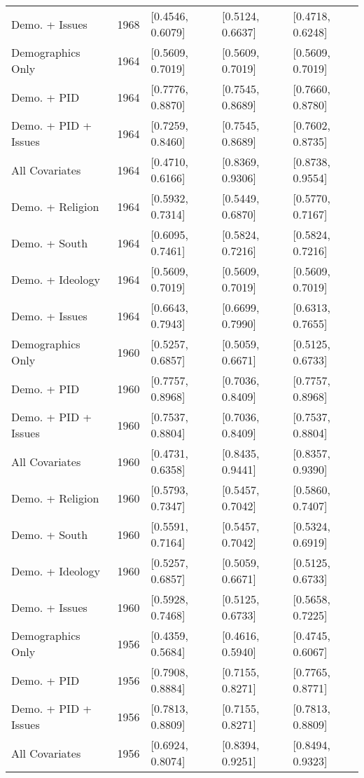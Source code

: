 \begin{longtable}{lrlll}
  Demo. + Issues & 1968 & [0.4546, 0.6079] & [0.5124, 0.6637] & [0.4718, 0.6248] \\ 
  Demographics Only & 1964 & [0.5609, 0.7019] & [0.5609, 0.7019] & [0.5609, 0.7019] \\ 
  Demo. + PID & 1964 & [0.7776, 0.8870] & [0.7545, 0.8689] & [0.7660, 0.8780] \\ 
  Demo. + PID + Issues & 1964 & [0.7259, 0.8460] & [0.7545, 0.8689] & [0.7602, 0.8735] \\ 
  All Covariates & 1964 & [0.4710, 0.6166] & [0.8369, 0.9306] & [0.8738, 0.9554] \\ 
  Demo. + Religion & 1964 & [0.5932, 0.7314] & [0.5449, 0.6870] & [0.5770, 0.7167] \\ 
  Demo. + South & 1964 & [0.6095, 0.7461] & [0.5824, 0.7216] & [0.5824, 0.7216] \\ 
  Demo. + Ideology & 1964 & [0.5609, 0.7019] & [0.5609, 0.7019] & [0.5609, 0.7019] \\ 
  Demo. + Issues & 1964 & [0.6643, 0.7943] & [0.6699, 0.7990] & [0.6313, 0.7655] \\ 
  Demographics Only & 1960 & [0.5257, 0.6857] & [0.5059, 0.6671] & [0.5125, 0.6733] \\ 
  Demo. + PID & 1960 & [0.7757, 0.8968] & [0.7036, 0.8409] & [0.7757, 0.8968] \\ 
  Demo. + PID + Issues & 1960 & [0.7537, 0.8804] & [0.7036, 0.8409] & [0.7537, 0.8804] \\ 
  All Covariates & 1960 & [0.4731, 0.6358] & [0.8435, 0.9441] & [0.8357, 0.9390] \\ 
  Demo. + Religion & 1960 & [0.5793, 0.7347] & [0.5457, 0.7042] & [0.5860, 0.7407] \\ 
  Demo. + South & 1960 & [0.5591, 0.7164] & [0.5457, 0.7042] & [0.5324, 0.6919] \\ 
  Demo. + Ideology & 1960 & [0.5257, 0.6857] & [0.5059, 0.6671] & [0.5125, 0.6733] \\ 
  Demo. + Issues & 1960 & [0.5928, 0.7468] & [0.5125, 0.6733] & [0.5658, 0.7225] \\ 
  Demographics Only & 1956 & [0.4359, 0.5684] & [0.4616, 0.5940] & [0.4745, 0.6067] \\ 
  Demo. + PID & 1956 & [0.7908, 0.8884] & [0.7155, 0.8271] & [0.7765, 0.8771] \\ 
  Demo. + PID + Issues & 1956 & [0.7813, 0.8809] & [0.7155, 0.8271] & [0.7813, 0.8809] \\ 
  All Covariates & 1956 & [0.6924, 0.8074] & [0.8394, 0.9251] & [0.8494, 0.9323] \\ 

\end{longtable}
